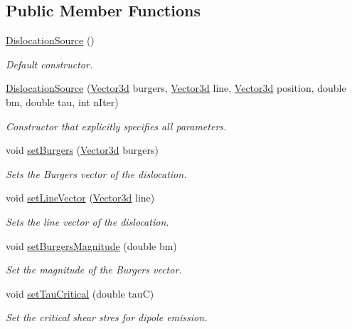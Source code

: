 \subsection*{\-Public \-Member \-Functions}
\begin{DoxyCompactItemize}
\item 
\hyperlink{classDislocationSource_afc9b7984d9486354b6f3d82033707577}{\-Dislocation\-Source} ()
\begin{DoxyCompactList}\small\item\em \-Default constructor. \end{DoxyCompactList}\item 
\hyperlink{classDislocationSource_aa5adcc1a0862d8cfa6d8d1a632c3855f}{\-Dislocation\-Source} (\hyperlink{classVector3d}{\-Vector3d} burgers, \hyperlink{classVector3d}{\-Vector3d} line, \hyperlink{classVector3d}{\-Vector3d} position, double bm, double tau, int n\-Iter)
\begin{DoxyCompactList}\small\item\em \-Constructor that explicitly specifies all parameters. \end{DoxyCompactList}\item 
void \hyperlink{classDislocationSource_ae1a26d9f8149206b884436f44e92f4c3}{set\-Burgers} (\hyperlink{classVector3d}{\-Vector3d} burgers)
\begin{DoxyCompactList}\small\item\em \-Sets the \-Burgers vector of the dislocation. \end{DoxyCompactList}\item 
void \hyperlink{classDislocationSource_adf7d0b496f5935909daf071a0d733b17}{set\-Line\-Vector} (\hyperlink{classVector3d}{\-Vector3d} line)
\begin{DoxyCompactList}\small\item\em \-Sets the line vector of the dislocation. \end{DoxyCompactList}\item 
void \hyperlink{classDislocationSource_a41c1f953f9ad57a2b1a9b8d412980d91}{set\-Burgers\-Magnitude} (double bm)
\begin{DoxyCompactList}\small\item\em \-Set the magnitude of the \-Burgers vector. \end{DoxyCompactList}\item 
void \hyperlink{classDislocationSource_a3294cb807ec8dd0e1fa6ab6e51eeafa2}{set\-Tau\-Critical} (double tau\-C)
\begin{DoxyCompactList}\small\item\em \-Set the critical shear stres for dipole emission. \end{DoxyCompactList}\item 

\end{DoxyCompactItemize}
